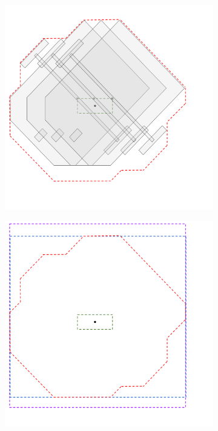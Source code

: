 \begin{figure}[t]
    \begin{subfigure}{0.4\textwidth}
        \centering
        \includegraphics[width=\linewidth]{figures/samp/CC3.png}
        \caption{}
        \vspace{-0.3cm}
        \label{fig:CC3}
    \end{subfigure}
    \begin{subfigure}{0.4\textwidth}
        \centering
        \includegraphics[width=\linewidth]{figures/samp/CCall.png}
        \caption{}
        \vspace{-0.3cm}
        \label{fig:CCall}
    \end{subfigure}


\end{figure}
